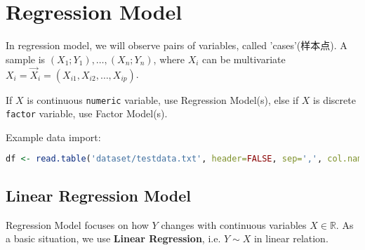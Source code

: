 \section{Regression Model}


    In regression model, we will observe pairs of variables, called 'cases'(样本点). A sample is $ (X_1;Y_1),\ldots,(X_n;Y_n) $, where $ X_i $ can be multivariate $ X_i=\vec{X}_i=(X_{i1},X_{i2},\ldots,X_{ip}) $.

    If $ X $ is continuous \lstinline|numeric| variable, use Regression Model(s), else if $ X $ is discrete \lstinline|factor| variable, use Factor Model(s). 

\begin{rcode}
    Example data import:
\begin{lstlisting}[language=R]
df <- read.table('dataset/testdata.txt', header=FALSE, sep=',', col.names = c('y','x1','x2'))
\end{lstlisting}
\end{rcode}


\subsection{Linear Regression Model}
    Regression Model focuses on how $ Y $ changes with continuous variables $ X\in\mathbb{R} $. As a basic situation, we use \textbf{Linear Regression}, i.e. $ Y\sim X $ in linear relation.  


